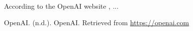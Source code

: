 \documentclass{article}
\begin{document}
According to the OpenAI website \cite{openai_website}, ...

\begin{thebibliography}{9}
OpenAI. (n.d.). OpenAI. Retrieved from \url{https://openai.com}
\end{thebibliography}
\end{document}
